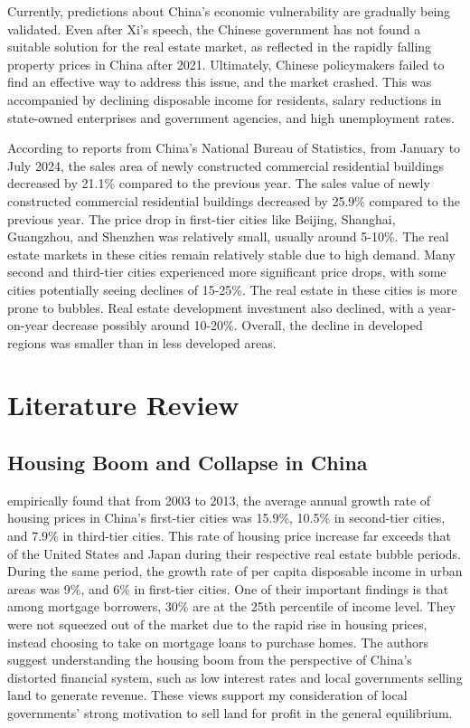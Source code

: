 \documentclass[12pt,english]{article}
\begin{document}
	Currently, predictions about China's economic vulnerability are gradually being validated. Even after Xi's speech, the Chinese government has not found a suitable solution for the real estate market, as reflected in the rapidly falling property prices in China after 2021. Ultimately, Chinese policymakers failed to find an effective way to address this issue, and the market crashed. This was accompanied by declining disposable income for residents, salary reductions in state-owned enterprises and government agencies, and high unemployment rates.
	
	According to reports from China's National Bureau of Statistics, from January to July 2024, the sales area of newly constructed commercial residential buildings decreased by 21.1\% compared to the previous year. The sales value of newly constructed commercial residential buildings decreased by 25.9\% compared to the previous year. The price drop in first-tier cities like Beijing, Shanghai, Guangzhou, and Shenzhen was relatively small, usually around 5-10\%. The real estate markets in these cities remain relatively stable due to high demand. Many second and third-tier cities experienced more significant price drops, with some cities potentially seeing declines of 15-25\%. The real estate in these cities is more prone to bubbles. Real estate development investment also declined, with a year-on-year decrease possibly around 10-20\%. Overall, the decline in developed regions was smaller than in less developed areas.
	\section{Literature Review}\label{sec:litreview}
	\subsection{Housing Boom and Collapse in China}
	\cite{fang2016demystifying} empirically found that from 2003 to 2013, the average annual growth rate of housing prices in China's first-tier cities was 15.9\%, 10.5\% in second-tier cities, and 7.9\% in third-tier cities. This rate of housing price increase far exceeds that of the United States and Japan during their respective real estate bubble periods. During the same period, the growth rate of per capita disposable income in urban areas was 9\%, and 6\% in first-tier cities. One of their important findings is that among mortgage borrowers, 30\% are at the 25th percentile of income level. They were not squeezed out of the market due to the rapid rise in housing prices, instead choosing to take on mortgage loans to purchase homes. The authors suggest understanding the housing boom from the perspective of China's distorted financial system, such as low interest rates and local governments selling land to generate revenue. These views support my consideration of local governments' strong motivation to sell land for profit in the general equilibrium.
	
\end{document}
